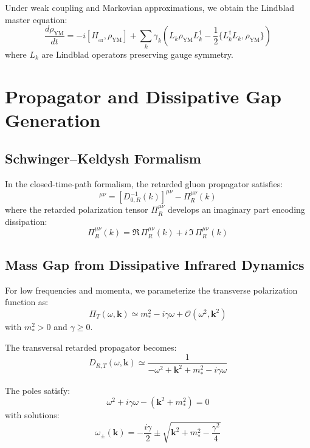 \documentclass[aps,prd,reprint,superscriptaddress,floatfix]{revtex4-2}
\newcommand{\eff}{_{\mathrm{eff}}}
\newcommand{\YM}{\mathrm{YM}}
\newcommand{\bigO}{\mathcal{O}}
\begin{document}
Under weak coupling and Markovian approximations, we obtain the Lindblad master equation:
\begin{equation}
\frac{d\rho_{\YM}}{dt} = -i[H_{\eff}, \rho_{\YM}] + \sum_k \gamma_k \left(L_k \rho_{\YM} L_k^{\dagger} - \frac{1}{2}\{L_k^{\dagger} L_k, \rho_{\YM}\}\right)
\end{equation}
where $L_k$ are Lindblad operators preserving gauge symmetry.

\section{Propagator and Dissipative Gap Generation}
\label{sec:propagator}

\subsection{Schwinger--Keldysh Formalism}
In the closed-time-path formalism, the retarded gluon propagator satisfies:
\begin{equation}
[D_R^{-1}(k)]^{\mu\nu} = [D_{0,R}^{-1}(k)]^{\mu\nu} - \Pi_R^{\mu\nu}(k)
\end{equation}
where the retarded polarization tensor $\Pi_R^{\mu\nu}$ develops an imaginary part encoding dissipation:
\begin{equation}
\Pi_R^{\mu\nu}(k) = \Re\,\Pi_R^{\mu\nu}(k) + i\,\Im\,\Pi_R^{\mu\nu}(k)
\end{equation}

\subsection{Mass Gap from Dissipative Infrared Dynamics}
For low frequencies and momenta, we parameterize the transverse polarization function as:
\begin{equation}
\Pi_T(\omega,\mathbf{k}) \simeq m_*^2 - i\gamma\omega + \bigO(\omega^2,\mathbf{k}^2)
\end{equation}
with $m_*^2 > 0$ and $\gamma \geq 0$.

The transversal retarded propagator becomes:
\begin{equation}
D_{R,T}(\omega,\mathbf{k}) \simeq \frac{1}{-\omega^2 + \mathbf{k}^2 + m_*^2 - i\gamma\omega}
\end{equation}

The poles satisfy:
\begin{equation}
\omega^2 + i\gamma\omega - (\mathbf{k}^2 + m_*^2) = 0
\end{equation}
with solutions:
\begin{equation}
\omega_{\pm}(\mathbf{k}) = -\frac{i\gamma}{2} \pm \sqrt{\mathbf{k}^2 + m_*^2 - \frac{\gamma^2}{4}}
\end{equation}
\end{document}
